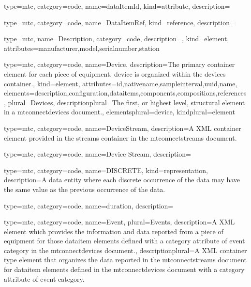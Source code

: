 {
  type=mtc,
  category=code,
  name={dataItemId},
  kind={attribute},
  description={}
}


{
  type=mtc,
  category=code,
  name={DataItemRef},
  kind={reference},
  description={}
}


{
  type=mtc,
  name={Description},
  category=code,
  description={},
  kind={element},
  attributes={\gls{manufacturer},\gls{model},\gls{serialnumber},\gls{station}}
}


{
  type=mtc,
  category=code,
  name={Device},
  description={The primary container element for each piece of equipment. \gls{device} is organized within the \glspl{device}  container.},
  kind={element},
  attributes={\gls{id},\gls{nativename},\gls{sampleinterval},\gls{uuid},\gls{name}},
  elements={\gls{description},\gls{configuration},\glspl{dataitem},\glspl{component},\glspl{composition},\glspl{reference}},
  plural={Devices},
  descriptionplural={The first, or highest level, \gls{structural element} in a \glspl{mtconnectdevice} document.},
  elementsplural={\gls{device}},
  kindplural={element}
}


{
  type=mtc,
  category=code,
  name={DeviceStream},
  description={A XML container element provided in the \glspl{stream} container in the \glspl{mtconnectstream} document.}
}


{
  type=mtc,
  category=code,
  name={Device Stream},
  description={}
}


{
  type=mtc,
  category=code,
  name={DISCRETE},
  kind={representation},
  description={A \gls{data entity} where each discrete occurrence of the data may have the same value as the previous occurrence of the data.}
}


{
  type=mtc,
  category=code,
  name={duration},
  description={}
}



{
  type=mtc,
  category=code,
  name={Event},
  plural={Events},
  description={A XML element which provides the information and data reported from a piece of equipment for those \gls{dataitem} elements defined with a \gls{category} attribute of \gls{event category} in the \glspl{mtconnectdevice} document.},
  descriptionplural={A XML container type element that organizes the data reported in the \glspl{mtconnectstream} document for \gls{dataitem} elements defined in the \glspl{mtconnectdevice} document with a \gls{category} attribute of \gls{event category}.}
}


